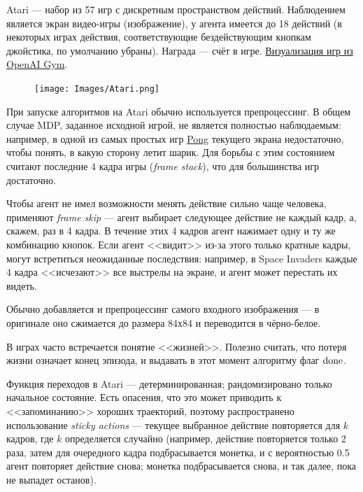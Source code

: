 \begin{example}
Atari --- набор из 57 игр с дискретным пространством действий. Наблюдением является экран видео-игры (изображение), у агента имеется до 18 действий (в некоторых играх действия, соответствующие бездействующим кнопкам джойстика, по умолчанию убраны). Награда --- счёт в игре. \href{https://gym.openai.com/envs/#atari}{Визуализация игр из OpenAI Gym}.

\begin{figure}
\centering
\vspace{-0.3cm}
\texttt{[image: Images/Atari.png]}
\vspace{-0.8cm}
\end{figure}

При запуске алгоритмов на Atari обычно используется препроцессинг. В общем случае MDP, заданное исходной игрой, не является полностью наблюдаемым: например, в одной из самых простых игр \href{https://gym.openai.com/envs/Pong-v0/}{Pong} текущего экрана недостаточно, чтобы понять, в какую сторону летит шарик. Для борьбы с этим состоянием считают последние 4 кадра игры (\emph{frame stack}), что для большинства игр достаточно.

Чтобы агент не имел возможности менять действие сильно чаще человека, применяют \emph{frame skip} --- агент выбирает следующее действие не каждый кадр, а, скажем, раз в 4 кадра. В течение этих 4 кадров агент нажимает одну и ту же комбинацию кнопок. Если агент <<видит>> из-за этого только кратные кадры, могут встретиться неожиданные последствия: например, в Space Invaders каждые 4 кадра <<исчезают>> все выстрелы на экране, и агент может перестать их видеть.

\begin{remark}
Обычно добавляется и препроцессинг самого входного изображения --- в оригинале оно сжимается до размера 84х84 и переводится в чёрно-белое.
\end{remark}

\begin{remark}
В играх часто встречается понятие <<жизней>>. Полезно считать, что потеря жизни означает конец эпизода, и выдавать в этот момент алгоритму флаг $\mathrm{done}$. 
\end{remark}

Функция переходов в Atari --- детерминированная; рандомизировано только начальное состояние. Есть опасения, что это может приводить к <<запоминанию>> хороших траекторий, поэтому распространено использование \emph{sticky actions} --- текущее выбранное действие повторяется для $k$ кадров, где $k$ определяется случайно (например, действие повторяется только 2 раза, затем для очередного кадра подбрасывается монетка, и с вероятностью 0.5 агент повторяет действие снова; монетка подбрасывается снова, и так далее, пока не выпадет останов).


\end{example}

